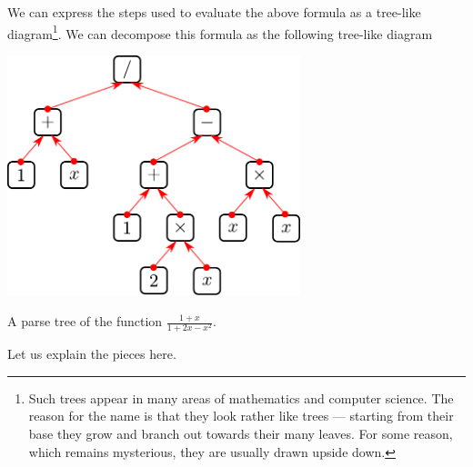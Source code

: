 We can express the steps used to evaluate the above formula as a tree-like
diagram\footnote{Such trees appear in many areas of mathematics and computer science. The
reason for the name is that they look rather like trees --- starting from their base they
grow and branch out towards their many leaves. For some reason, which remains mysterious,
they are usually drawn upside down.}.
We can decompose this formula as the following tree-like diagram
\begin{fig}
\label{fig tree rational}
  \begin{center}
  \includegraphics[height=7cm]{tree1}

  A parse tree of the function $\frac{1+x}{1+2x-x^2}$.
  \end{center}
\end{fig}
Let us explain the pieces here.
